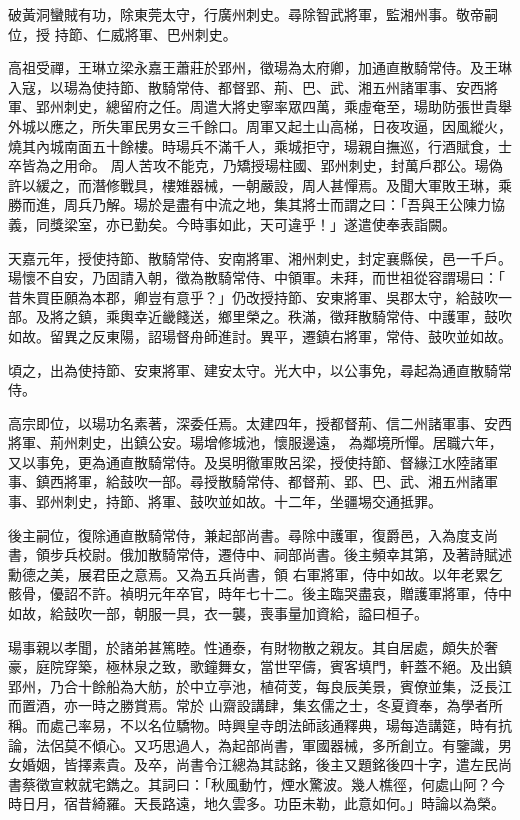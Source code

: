 \begin{pinyinscope}
 破黃洞蠻賊有功，除東莞太守，行廣州刺史。尋除智武將軍，監湘州事。敬帝嗣位，授
 持節、仁威將軍、巴州刺史。



 高祖受禪，王琳立梁永嘉王蕭莊於郢州，徵瑒為太府卿，加通直散騎常侍。及王琳入寇，以瑒為使持節、散騎常侍、都督郢、荊、巴、武、湘五州諸軍事、安西將軍、郢州刺史，總留府之任。周遣大將史寧率眾四萬，乘虛奄至，瑒助防張世貴舉外城以應之，所失軍民男女三千餘口。周軍又起土山高梯，日夜攻逼，因風縱火，燒其內城南面五十餘樓。時瑒兵不滿千人，乘城拒守，瑒親自撫巡，行酒賦食，士卒皆為之用命。
 周人苦攻不能克，乃矯授瑒柱國、郢州刺史，封萬戶郡公。瑒偽許以緩之，而潛修戰具，樓雉器械，一朝嚴設，周人甚憚焉。及聞大軍敗王琳，乘勝而進，周兵乃解。瑒於是盡有中流之地，集其將士而謂之曰：「吾與王公陳力協義，同獎梁室，亦已勤矣。今時事如此，天可違乎！」遂遣使奉表詣闕。



 天嘉元年，授使持節、散騎常侍、安南將軍、湘州刺史，封定襄縣侯，邑一千戶。瑒懷不自安，乃固請入朝，徵為散騎常侍、中領軍。未拜，而世祖從容謂瑒曰：「
 昔朱買臣願為本郡，卿豈有意乎？」仍改授持節、安東將軍、吳郡太守，給鼓吹一部。及將之鎮，乘輿幸近畿餞送，鄉里榮之。秩滿，徵拜散騎常侍、中護軍，鼓吹如故。留異之反東陽，詔瑒督舟師進討。異平，遷鎮右將軍，常侍、鼓吹並如故。



 頃之，出為使持節、安東將軍、建安太守。光大中，以公事免，尋起為通直散騎常侍。



 高宗即位，以瑒功名素著，深委任焉。太建四年，授都督荊、信二州諸軍事、安西將軍、荊州刺史，出鎮公安。瑒增修城池，懷服邊遠，
 為鄰境所憚。居職六年，又以事免，更為通直散騎常侍。及吳明徹軍敗呂梁，授使持節、督緣江水陸諸軍事、鎮西將軍，給鼓吹一部。尋授散騎常侍、都督荊、郢、巴、武、湘五州諸軍事、郢州刺史，持節、將軍、鼓吹並如故。十二年，坐疆埸交通抵罪。



 後主嗣位，復除通直散騎常侍，兼起部尚書。尋除中護軍，復爵邑，入為度支尚書，領步兵校尉。俄加散騎常侍，遷侍中、祠部尚書。後主頻幸其第，及著詩賦述勳德之美，展君臣之意焉。又為五兵尚書，領
 右軍將軍，侍中如故。以年老累乞骸骨，優詔不許。禎明元年卒官，時年七十二。後主臨哭盡哀，贈護軍將軍，侍中如故，給鼓吹一部，朝服一具，衣一襲，喪事量加資給，謚曰桓子。



 瑒事親以孝聞，於諸弟甚篤睦。性通泰，有財物散之親友。其自居處，頗失於奢豪，庭院穿築，極林泉之致，歌鐘舞女，當世罕儔，賓客填門，軒蓋不絕。及出鎮郢州，乃合十餘船為大舫，於中立亭池，植荷芰，每良辰美景，賓僚並集，泛長江而置酒，亦一時之勝賞焉。常於
 山齋設講肆，集玄儒之士，冬夏資奉，為學者所稱。而處己率易，不以名位驕物。時興皇寺朗法師該通釋典，瑒每造講筵，時有抗論，法侶莫不傾心。又巧思過人，為起部尚書，軍國器械，多所創立。有鑒識，男女婚姻，皆擇素貴。及卒，尚書令江總為其誌銘，後主又題銘後四十字，遣左民尚書蔡徵宣敕就宅鐫之。其詞曰：「秋風動竹，煙水驚波。幾人樵徑，何處山阿？今時日月，宿昔綺羅。天長路遠，地久雲多。功臣未勒，此意如何。」時論以為榮。




\end{pinyinscope}
